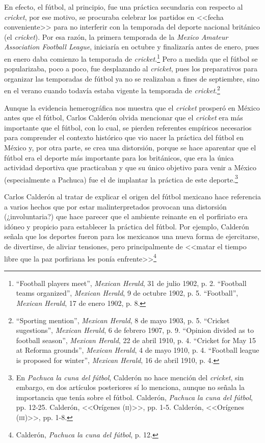 \documentclass[11pt,a5paper,twoside]{book} %
\begin{document}
En efecto, el fútbol, al principio, fue una práctica secundaria con respecto al \emph{cricket}, por ese motivo, se procuraba celebrar los partidos  en <<fecha conveniente>> para no interferir con la temporada del deporte nacional británico (el \emph{cricket}). Por esa razón, la primera temporada de la \emph{Mexico Amateur Association Football League}, iniciaría en octubre y finalizaría antes de enero, pues en enero daba comienzo la temporada de \emph{cricket}.\footnote{``Football players meet'', \emph{Mexican Herald}, 31 de julio 1902, p. 2. ``Football teams organized'', \emph{Mexican Herald}, 9 de octubre 1902, p. 5. ``Football'', \emph{Mexican Herald}, 17 de enero 1902, p. 8.} Pero a
medida que el fútbol se popularizaba, poco a poco, fue desplazando al \emph{cricket}, pues los preparativos para organizar las temporadas de fútbol ya no se realizaban a fines de septiembre, sino en el verano cuando todavía estaba vigente la temporada de \emph{cricket}.\footnote{``Sporting mention'', \emph{Mexican Herald}, 8 de mayo 1903, p. 5. ``Cricket sugestions'', \emph{Mexican Herald}, 6 de febrero 1907, p. 9. ``Opinion divided as to football season'', \emph{Mexican Herald}, 22 de abril 1910, p. 4. ``Cricket for May 15 at Reforma grounds'', \emph{Mexican Herald}, 4 de mayo 1910, p. 4. ``Football league is proposed for winter'', \emph{Mexican Herald}, 16 de abril 1910, p. 4.}

Aunque la evidencia hemerográfica nos muestra que el \emph{cricket} prosperó en México
antes que el fútbol, Carlos Calderón olvida mencionar que el \emph{cricket} era más importante que
el fútbol, con lo cual, se pierden referentes empíricos necesarios para comprender el contexto
histórico que vio nacer la práctica del fútbol en México y, por otra parte, se crea una
distorsión, porque se hace aparentar que el fútbol era el deporte más importante para los británicos, que era la única actividad deportiva que practicaban y que su único objetivo para
venir a México (especialmente a Pachuca) fue el de implantar la práctica de este deporte.\footnote{En \emph{Pachuca la cuna del fútbol}, Calderón no hace mención del \emph{cricket}, sin embargo, en dos artículos posteriores sí lo menciona, aunque no señala la importancia que tenía sobre el fútbol. Calderón, \emph{Pachuca la cuna del fútbol}, pp. 12-25. Calderón, <<Orígenes (\textsc{ii})>>, pp. 1-5. Calderón, <<Orígenes (\textsc{iii})>>, pp. 1-8.}

Carlos Calderón al tratar de explicar el origen del fútbol mexicano hace referencia a
varios hechos que por estar malinterpretados provocan una distorsión (¿involuntaria?) que
hace parecer que el ambiente reinante en el porfiriato era idóneo y propicio para establecer
la práctica del fútbol. Por ejemplo, Calderón señala que los deportes fueron para los
mexicanos una nueva forma de ejercitarse, de divertirse, de aliviar tensiones, pero principalmente de <<matar el tiempo libre que la paz porfiriana les ponía enfrente>>\footnote{Calderón, \emph{Pachuca la cuna del fútbol}, p. 12.}
\end{document}
